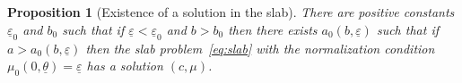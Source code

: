 \documentclass[11pt]{article}    %
\newtheorem{proposition}[theorem]{Proposition}
\renewcommand{\epsilon}{\varepsilon}
\newcommand{\eps}{\varepsilon}
\begin{document}
\begin{proposition}[Existence of a solution in the slab]\label{slabsol}
There are positive constants $\underline\eps_0$ and $b_0$ such that if $\underline \eps < \underline\eps_0$ and $b > b_0$ then there exists $a_0(b,\underline\eps)$ such that if $a > a_0(b,\underline\eps)$ then the slab problem~\eqref{eq:slab} with the normalization condition $\mu_0(0,\underline \theta) = \underline\epsilon$ has a solution $(c,\mu)$.
\end{proposition}
\end{document}
